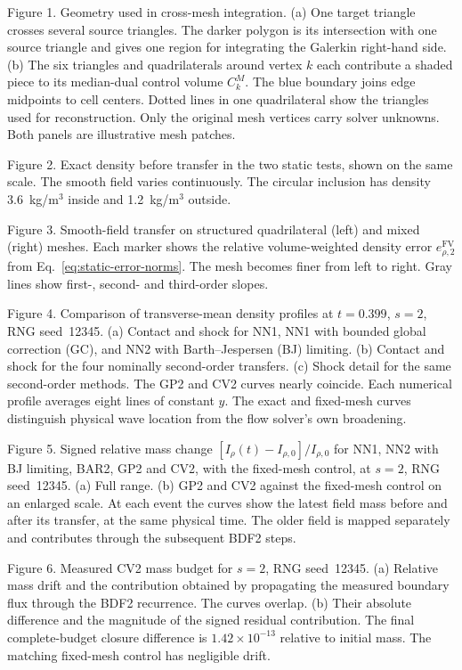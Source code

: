 Figure 1. Geometry used in cross-mesh integration. (a) One target triangle crosses several source triangles. The darker polygon is its intersection with one source triangle and gives one region for integrating the Galerkin right-hand side. (b) The six triangles and quadrilaterals around vertex $k$ each contribute a shaded piece to its median-dual control volume $C_k^M$. The blue boundary joins edge midpoints to cell centers. Dotted lines in one quadrilateral show the triangles used for reconstruction. Only the original mesh vertices carry solver unknowns. Both panels are illustrative mesh patches.

Figure 2. Exact density before transfer in the two static tests, shown on the same scale. The smooth field varies continuously. The circular inclusion has density 3.6~kg/m$^3$ inside and 1.2~kg/m$^3$ outside.

Figure 3. Smooth-field transfer on structured quadrilateral (left) and mixed (right) meshes. Each marker shows the relative volume-weighted density error $e_{\rho,2}^{\mathrm{FV}}$ from Eq.~\eqref{eq:static-error-norms}. The mesh becomes finer from left to right. Gray lines show first-, second- and third-order slopes.

Figure 4. Comparison of transverse-mean density profiles at $t=0.399$, $s=2$, RNG seed~12345. (a) Contact and shock for NN1, NN1 with bounded global correction (GC), and NN2 with Barth--Jespersen (BJ) limiting. (b) Contact and shock for the four nominally second-order transfers. (c) Shock detail for the same second-order methods. The GP2 and CV2 curves nearly coincide. Each numerical profile averages eight lines of constant $y$. The exact and fixed-mesh curves distinguish physical wave location from the flow solver's own broadening.

Figure 5. Signed relative mass change $[I_\rho(t)-I_{\rho,0}]/I_{\rho,0}$ for NN1, NN2 with BJ limiting, BAR2, GP2 and CV2, with the fixed-mesh control, at $s=2$, RNG seed~12345. (a) Full range. (b) GP2 and CV2 against the fixed-mesh control on an enlarged scale. At each event the curves show the latest field mass before and after its transfer, at the same physical time. The older field is mapped separately and contributes through the subsequent BDF2 steps.

Figure 6. Measured CV2 mass budget for $s=2$, RNG seed~12345. (a) Relative mass drift and the contribution obtained by propagating the measured boundary flux through the BDF2 recurrence. The curves overlap. (b) Their absolute difference and the magnitude of the signed residual contribution. The final complete-budget closure difference is $1.42\times10^{-13}$ relative to initial mass. The matching fixed-mesh control has negligible drift.

